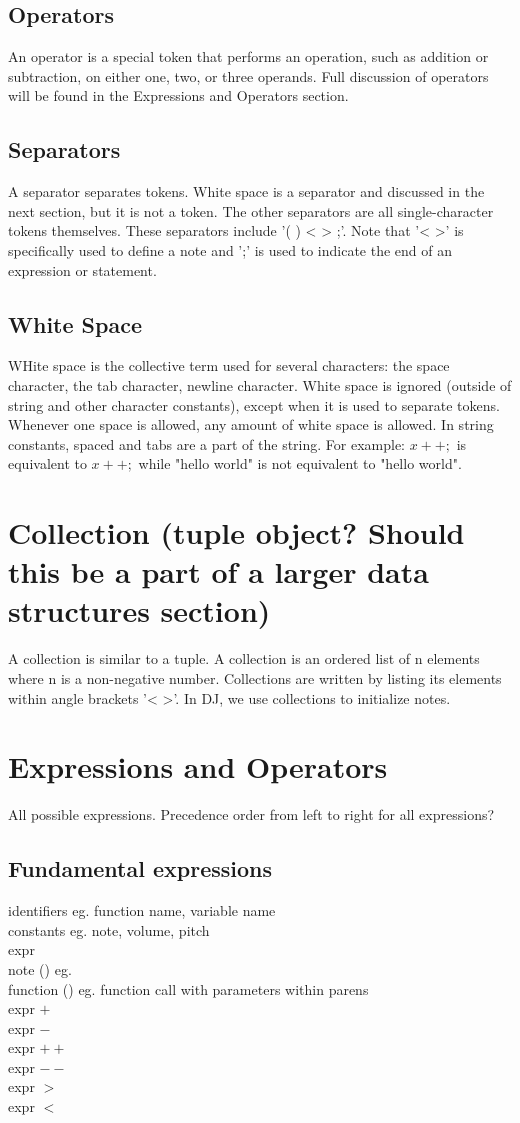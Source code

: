 \documentclass[letterpaper]{article}
\begin{document}
\subsection{Operators}
An operator is a special token that performs an operation, such as addition or subtraction, on either one, two, or three operands. Full discussion of operators will be found in the Expressions and Operators section.
\subsection{Separators}
A separator separates tokens. White space is a separator and discussed in the next section, but it is not a token. The other separators are all single-character tokens themselves. These separators include '( ) < > ;'. Note that '< >' is specifically used to define a note and ';' is used to indicate the end of an expression or statement. 
\subsection{White Space}
WHite space is the collective term used for several characters: the space character, the tab character, newline character. White space is ignored (outside of string and other character constants),  except when it is used to separate tokens. Whenever one space is allowed, any amount of white space is allowed. In string constants, spaced and tabs are a part of the string.
For example: $x++;$ is equivalent to $x     ++;$ while "hello world" is not equivalent to "hello         world".
\section{Collection (tuple object? Should this be a part of a larger data structures section)}
A collection is similar to a tuple. A collection is an ordered list of n elements where n is a non-negative number. Collections are written by listing its elements within angle brackets '< >'. In DJ, we use collections to initialize notes. 
\section{Expressions and Operators}
All possible expressions. Precedence order from left to right for all expressions?
\subsection{Fundamental expressions}
identifiers eg. function name, variable name\\
constants eg. note, volume, pitch\\
expr\\
note () eg.\\
function () eg. function call with parameters within parens\\
expr $+$\\
expr $-$\\
expr $++$\\
expr $--$\\
expr $>$\\
expr $<$\\
\end{document}
